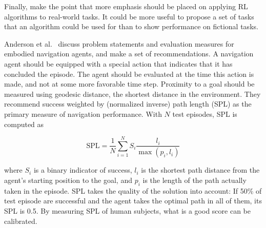 Finally, \cite{henderson_matters_2018} make the point that more emphasis should be placed on applying RL algorithms to real-world tasks.
It could be more useful to propose a set of tasks that an algorithm could be used for than to show performance on fictional tasks.

Anderson et al.~\cite{anderson_evaluation_2018} discuss problem statements and evaluation measures for embodied navigation agents, and make a set of recommendations.
A navigation agent should be equipped with a special action that indicates that it has concluded the episode.
The agent should be evaluated at the time this action is made, and not at some more favorable time step.
Proximity to a goal should be measured using geodesic distance, the shortest distance in the environment.
They recommend success weighted by (normalized inverse) path length (SPL) as the primary measure of navigation performance.
With \(N\) test episodes, SPL is computed as 

\begin{equation}
    \text{SPL} = \frac{1}{N} \sum_{i=1}^N S_i \frac{l_i}{\max(p_i, l_i)}
    \label{equ:spl}
\end{equation}

where \(S_i\) is a binary indicator of success,
\(l_i\) is the shortest path distance from the agent's starting position to the goal,
and \(p_i\) is the length of the path actually taken in the episode.
SPL takes the quality of the solution into account:
If 50\% of test episode are successful and the agent takes the optimal path in all of them, its SPL is 0.5.
By measuring SPL of human subjects, what is a good score can be calibrated.
